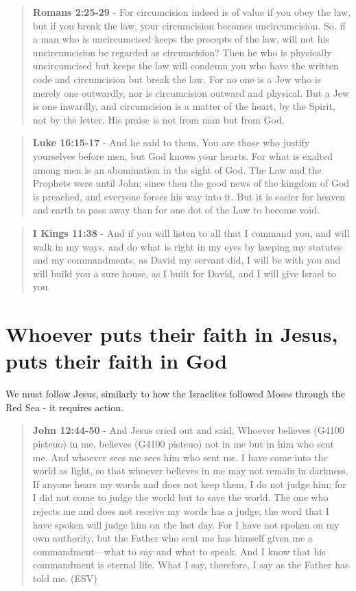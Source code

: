 \documentclass[11pt]{article}
\begin{document}
\begin{quote}
\textbf{Romans 2:25-29} - For circumcision indeed is of value if you obey the law, but if you break the law, your circumcision becomes uncircumcision. So, if a man who is uncircumcised keeps the precepts of the law, will not his uncircumcision be regarded as circumcision? Then he who is physically uncircumcised but keeps the law will condemn you who have the written code and circumcision but break the law. For no one is a Jew who is merely one outwardly, nor is circumcision outward and physical. But a Jew is one inwardly, and circumcision is a matter of the heart, by the Spirit, not by the letter. His praise is not from man but from God.
\end{quote}

\begin{quote}
\textbf{Luke 16:15-17} - And he said to them, You are those who justify yourselves before men, but God knows your hearts. For what is exalted among men is an abomination in the sight of God.  The Law and the Prophets were until John; since then the good news of the kingdom of God is preached, and everyone forces his way into it.  But it is easier for heaven and earth to pass away than for one dot of the Law to become void.
\end{quote}

\begin{quote}
\textbf{I Kings 11:38} - And if you will listen to all that I command you, and will walk in my ways, and do what is right in my eyes by keeping my statutes and my commandments, as David my servant did, I will be with you and will build you a sure house, as I built for David, and I will give Israel to you.
\end{quote}

\section{Whoever puts their faith in Jesus, puts their faith in God}
\label{sec:org10d23e9}
We must follow Jesus, similarly to how the Israelites followed Moses through the Red Sea - it requires action.

\begin{quote}
\textbf{John 12:44-50} - And Jesus cried out and said, Whoever believes (G4100 pisteuo) in me, believes (G4100 pisteuo) not in me but in him who sent me.  And whoever sees me sees him who sent me.  I have come into the world as light, so that whoever believes in me may not remain in darkness.  If anyone hears my words and does not keep them, I do not judge him; for I did not come to judge the world but to save the world.  The one who rejects me and does not receive my words has a judge; the word that I have spoken will judge him on the last day.  For I have not spoken on my own authority, but the Father who sent me has himself given me a commandment—what to say and what to speak.  And I know that his commandment is eternal life.  What I say, therefore, I say as the Father has told me. (ESV)
\end{quote}
\end{document}
